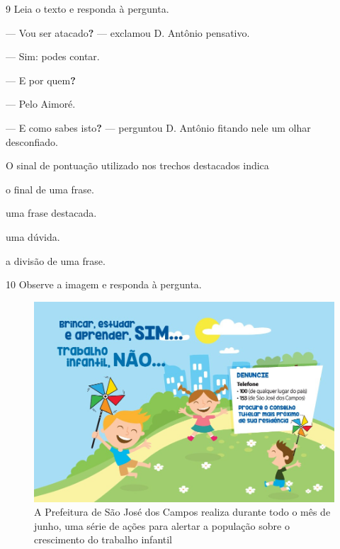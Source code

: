 \num{9} Leia o texto e responda à pergunta.

\begin{myquote}
\textit{}

--- Vou ser atacado\textbf{?} --- exclamou D. Antônio pensativo.

--- Sim: podes contar.

--- E por quem\textbf{?}

--- Pelo Aimoré.

--- E como sabes isto\textbf{?} --- perguntou D. Antônio fitando nele um olhar
desconfiado.

\end{myquote}

O sinal de pontuação utilizado nos trechos destacados indica

\begin{escolha}
  \item o final de uma frase.

  \item uma frase destacada.

  \item uma dúvida.

  \item a divisão de uma frase.
\end{escolha} 

\pagebreak

\num{10} Observe a imagem e responda à pergunta.

\begin{figure}[htpb!]
\includegraphics[width=\textwidth]{./imgQ4PORT/media/image1.jpeg}
\caption{A Prefeitura de São José dos Campos realiza durante todo o mês
de junho, uma série de ações para alertar a população sobre o
crescimento do trabalho infantil}
\end{figure}

